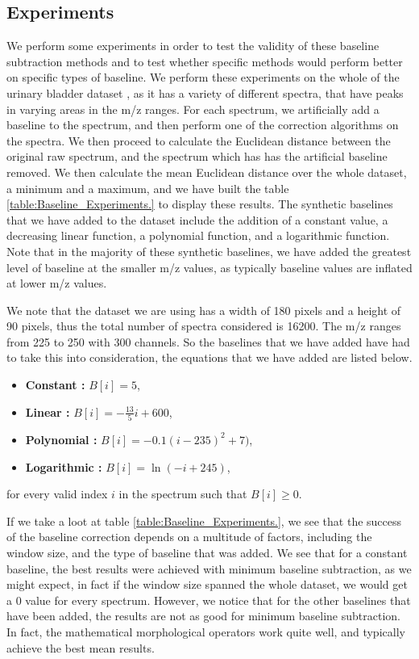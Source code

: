 \documentclass[11pt,openany]{book}
\begin{document}
\subsection{Experiments}
We perform some experiments in order to test the validity of these baseline subtraction methods and to test whether specific methods would perform better on specific types of baseline. We perform these experiments on the whole of the urinary bladder dataset \cite{imzml.org}, as it has a variety of different spectra, that have peaks in varying areas in the m/z ranges. For each spectrum, we artificially add a baseline to the spectrum, and then perform one of the correction algorithms on the spectra. We then proceed to calculate the Euclidean distance between the original raw spectrum, and the spectrum which has has the artificial baseline removed. We then calculate the mean Euclidean distance over the whole dataset, a minimum and a maximum, and we have built the table \ref{table:Baseline_Experiments.} to display these results. The synthetic baselines that we have added to the dataset include the addition of a constant value, a decreasing linear function, a polynomial function, and a logarithmic function. Note that in the majority of these synthetic baselines, we have added the greatest level of baseline at the smaller m/z values, as typically baseline values are inflated at lower m/z values. 

We note that the dataset we are using has a width of 180 pixels and a height of 90 pixels, thus the total number of spectra considered is 16200. The m/z ranges from 225 to 250 with 300 channels. So the baselines that we have added have had to take this into consideration, the equations that we have added are listed below.

\begin{itemize}
    \item \textbf{Constant : } $B[i] = 5$,
    \item \textbf{Linear : } $B[i] = -\frac{13}{5}i + 600$,
    \item \textbf{Polynomial : } $B[i] = -0.1(i - 235)^2 + 7)$,
    \item \textbf{Logarithmic : } $B[i] = \ln(-i + 245)$,
\end{itemize}

for every valid index $i$ in the spectrum such that $B[i] \geq 0$.

If we take a loot at table \ref{table:Baseline_Experiments.}, we see that the success of the baseline correction depends on a multitude of factors, including the window size, and the type of baseline that was added. We see that for a constant baseline, the best results were achieved with minimum baseline subtraction, as we might expect, in fact if the window size spanned the whole dataset, we would get a 0 value for every spectrum. However, we notice that for the other baselines that have been added, the results are not as good for minimum baseline subtraction. In fact, the mathematical morphological operators work quite well, and typically achieve the best mean results.
\end{document}
